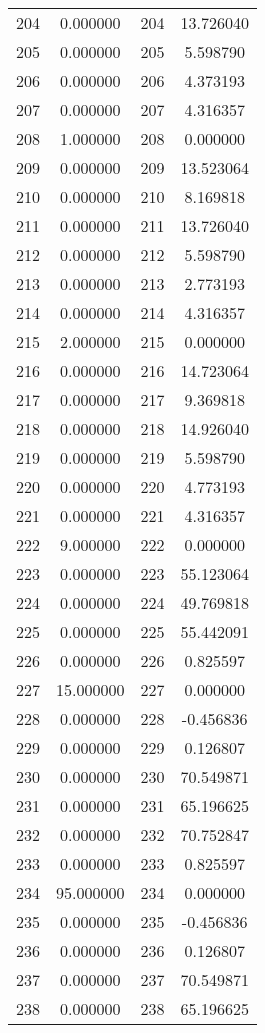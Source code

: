 \documentclass[12pt]{article}
\begin{document}
\begin{longtable}{@{}cccc@{}}
204 & 0.000000 & 204 & 13.726040 \\
205 & 0.000000 & 205 & 5.598790 \\
206 & 0.000000 & 206 & 4.373193 \\
207 & 0.000000 & 207 & 4.316357 \\
208 & 1.000000 & 208 & 0.000000 \\
209 & 0.000000 & 209 & 13.523064 \\
210 & 0.000000 & 210 & 8.169818 \\
211 & 0.000000 & 211 & 13.726040 \\
212 & 0.000000 & 212 & 5.598790 \\
213 & 0.000000 & 213 & 2.773193 \\
214 & 0.000000 & 214 & 4.316357 \\
215 & 2.000000 & 215 & 0.000000 \\
216 & 0.000000 & 216 & 14.723064 \\
217 & 0.000000 & 217 & 9.369818 \\
218 & 0.000000 & 218 & 14.926040 \\
219 & 0.000000 & 219 & 5.598790 \\
220 & 0.000000 & 220 & 4.773193 \\
221 & 0.000000 & 221 & 4.316357 \\
222 & 9.000000 & 222 & 0.000000 \\
223 & 0.000000 & 223 & 55.123064 \\
224 & 0.000000 & 224 & 49.769818 \\
225 & 0.000000 & 225 & 55.442091 \\
226 & 0.000000 & 226 & 0.825597 \\
227 & 15.000000 & 227 & 0.000000 \\
228 & 0.000000 & 228 & -0.456836 \\
229 & 0.000000 & 229 & 0.126807 \\
230 & 0.000000 & 230 & 70.549871 \\
231 & 0.000000 & 231 & 65.196625 \\
232 & 0.000000 & 232 & 70.752847 \\
233 & 0.000000 & 233 & 0.825597 \\
234 & 95.000000 & 234 & 0.000000 \\
235 & 0.000000 & 235 & -0.456836 \\
236 & 0.000000 & 236 & 0.126807 \\
237 & 0.000000 & 237 & 70.549871 \\
238 & 0.000000 & 238 & 65.196625 \\

\end{longtable}
\end{document}
